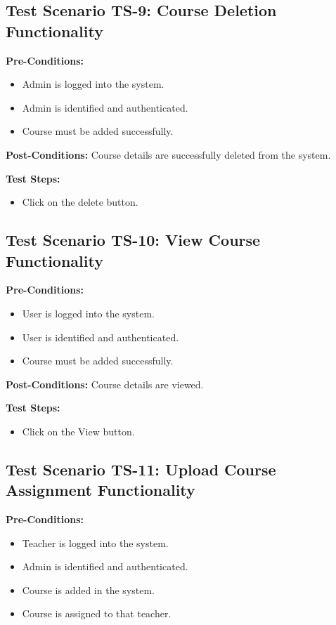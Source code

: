 \subsection{Test Scenario TS-9: Course Deletion Functionality}
\textbf{Pre-Conditions: }
\begin{itemize}

\item Admin is logged into the system.
\item Admin is identified and authenticated.
\item Course must be added successfully.

\end{itemize}
\textbf{Post-Conditions: } Course details are successfully deleted from the system.

\textbf{Test Steps:}
\begin{itemize}

\item Click on the delete button.

\end{itemize}

\subsection{Test Scenario TS-10: View Course Functionality}
\textbf{Pre-Conditions: }
\begin{itemize}

\item User is logged into the system.
\item User is identified and authenticated.
\item Course must be added successfully.

\end{itemize}
\textbf{Post-Conditions: } Course details are viewed.

\textbf{Test Steps:}
\begin{itemize}

\item Click on the View button.

\end{itemize}


\subsection{Test Scenario TS-11: Upload Course Assignment Functionality}
\textbf{Pre-Conditions: } 
\begin{itemize}

\item Teacher is logged into the system.
\item Admin is identified and authenticated.
\item Course is added in the system.
\item Course is assigned to that teacher.

\end{itemize}

